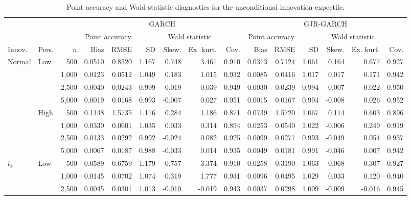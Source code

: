 \begin{table}
\centering
\caption{Point accuracy and Wald-statistic diagnostics for the unconditional innovation expectile.}
\label{tab:mc-xi-wald-diagnostics}
\small
\setlength{\tabcolsep}{2.8pt}
\renewcommand{\arraystretch}{1.03}
\begin{tabular}{llr*{12}{r}}
\toprule
&&&\multicolumn{6}{c}{GARCH}&\multicolumn{6}{c}{GJR-GARCH}\\
\cmidrule(lr){4-9}\cmidrule(lr){10-15}
&&&\multicolumn{2}{c}{Point accuracy}&\multicolumn{4}{c}{Wald statistic}&\multicolumn{2}{c}{Point accuracy}&\multicolumn{4}{c}{Wald statistic}\\
\cmidrule(lr){4-5}\cmidrule(lr){6-9}\cmidrule(lr){10-11}\cmidrule(lr){12-15}
Innov. & Pers. & $n$ & Bias & RMSE & SD & Skew. & Ex. kurt. & Cov. & Bias & RMSE & SD & Skew. & Ex. kurt. & Cov.\\
\midrule
Normal & Low & 500 & 0.0510 & 0.8520 & 1.167 & 0.748 & 3.461 & 0.910 & 0.0313 & 0.7124 & 1.061 & 0.164 & 0.677 & 0.927\\
 &  & 1,000 & 0.0123 & 0.0512 & 1.049 & 0.183 & 1.015 & 0.932 & 0.0085 & 0.0416 & 1.017 & 0.017 & 0.171 & 0.942\\
 &  & 2,500 & 0.0040 & 0.0243 & 0.999 & 0.019 & 0.039 & 0.949 & 0.0030 & 0.0239 & 0.994 & 0.007 & 0.022 & 0.950\\
 &  & 5,000 & 0.0019 & 0.0168 & 0.993 & -0.007 & 0.027 & 0.951 & 0.0015 & 0.0167 & 0.994 & -0.008 & 0.026 & 0.952\\
\addlinespace[1pt]
 & High & 500 & 0.1148 & 1.5735 & 1.116 & 0.284 & 1.186 & 0.871 & 0.0739 & 1.5720 & 1.067 & 0.114 & 0.603 & 0.896\\
 &  & 1,000 & 0.0330 & 0.0601 & 1.035 & 0.033 & 0.314 & 0.894 & 0.0253 & 0.0540 & 1.022 & -0.006 & 0.249 & 0.919\\
 &  & 2,500 & 0.0133 & 0.0292 & 0.992 & -0.024 & 0.082 & 0.925 & 0.0099 & 0.0277 & 0.993 & -0.049 & 0.054 & 0.937\\
 &  & 5,000 & 0.0067 & 0.0187 & 0.988 & -0.033 & 0.014 & 0.935 & 0.0049 & 0.0181 & 0.991 & -0.046 & 0.007 & 0.942\\
\addlinespace[3pt]
$t_8$ & Low & 500 & 0.0589 & 0.6759 & 1.179 & 0.757 & 3.374 & 0.910 & 0.0258 & 0.3190 & 1.063 & 0.068 & 0.307 & 0.927\\
 &  & 1,000 & 0.0145 & 0.0702 & 1.074 & 0.319 & 1.777 & 0.931 & 0.0096 & 0.0495 & 1.029 & 0.033 & 0.120 & 0.940\\
 &  & 2,500 & 0.0045 & 0.0301 & 1.013 & -0.010 & -0.019 & 0.943 & 0.0037 & 0.0298 & 1.009 & -0.009 & -0.016 & 0.945\\

\end{tabular}
\end{table}
